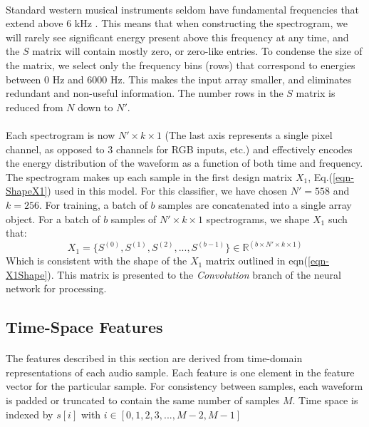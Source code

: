 \documentclass[12pt,letterpaper]{article}
\begin{document}
\paragraph*{}Standard western musical instruments seldom have fundamental frequencies that extend above $6$ kHz \cite{Olson,Virtanen,White}. This means that when constructing the spectrogram, we will rarely see significant energy present above this frequency at any time, and the $S$ matrix will contain mostly zero, or zero-like entries. To condense the size of the matrix, we select only the frequency bins (rows) that correspond to energies between $0$ Hz and $6000$ Hz. This makes the input array smaller, and eliminates redundant and non-useful information. The number rows in the $S$ matrix is reduced from $N$ down to $N'$. 

\paragraph*{}Each spectrogram is now $N' \times k \times 1$ (The last axis represents a single pixel channel, as opposed to $3$ channels for RGB inputs, etc.) and effectively encodes the energy distribution of the waveform as a function of both time and frequency. The spectrogram makes up each sample in the first design matrix $X_1$, Eq.(\ref{eqn-ShapeX1}) used in this model. For this classifier, we have chosen $N' = 558$ and $k = 256$. For training, a batch of $b$ samples are concatenated into a single array object. For a batch of $b$ samples of $N' \times k \times 1$ spectrograms, we shape $X_1$ such that:
\begin{equation}
\label{eqn-X1}
X_1 = \big\{ S^{(0)},S^{(1)},S^{(2)}, ... , S^{(b-1)} \big\} \in \mathbb{R}^{(b \times N' \times k \times 1)}
\end{equation}
Which is consistent with the shape of the $X_1$ matrix outlined in eqn(\ref{eqn-X1Shape}). This matrix is presented to the \textit{Convolution} branch of the neural network for processing.


\subsection{Time-Space Features}
\label{subsec-time}

\paragraph*{}The features described in this section are derived from time-domain representations of each audio sample. Each feature is one element in the feature vector for the particular sample. For consistency between samples, each waveform is padded or truncated to contain the same number of samples $M$. Time space is indexed by $s[i]$ with $i \in [0,1,2,3,...,M-2,M-1]$
\end{document}
